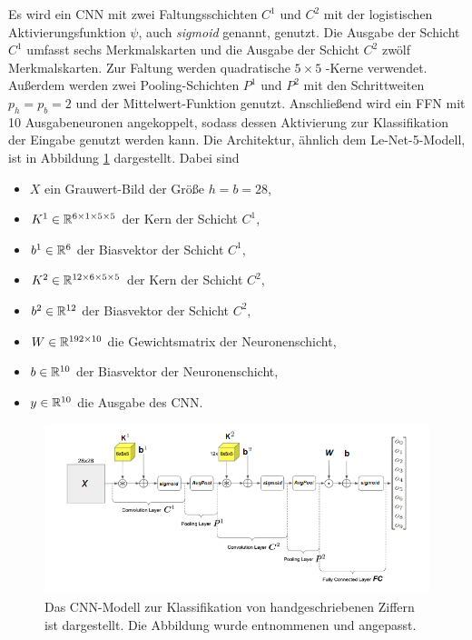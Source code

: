 Es wird ein CNN mit zwei Faltungsschichten $C^1$ und $C^2$ mit der logistischen Aktivierungsfunktion $\psi$, auch \textit{sigmoid} genannt, genutzt. Die Ausgabe der Schicht $C^1$ umfasst sechs Merkmalskarten und die Ausgabe der Schicht $C^2$ zwölf Merkmalskarten. Zur Faltung werden quadratische $5 \times 5$ -Kerne verwendet. Außerdem werden zwei Pooling-Schichten $P^1$ und $P^2$ mit den Schrittweiten $p_h=p_b=2$ und der Mittelwert-Funktion genutzt. Anschließend wird ein FFN mit 10 Ausgabeneuronen angekoppelt, sodass dessen Aktivierung zur Klassifikation der Eingabe genutzt werden kann. Die Architektur, ähnlich dem Le-Net-5-Modell\cite{DBLP:journals/pieee/LeCunBBH98}, ist in Abbildung \ref{modell} dargestellt. Dabei sind

\begin{itemize}
    \item $X$ ein Grauwert-Bild der Größe $h=b=28$,
    \item $K^1 \in \mathbb{R}^{6 \times 1 \times 5 \times 5}$ der Kern der Schicht $C^1$,
    \item $b^1 \in \mathbb{R}^6$ der Biasvektor der Schicht $C^1$,
    \item $K^2 \in \mathbb{R}^{12 \times 6 \times 5 \times 5}$ der Kern der Schicht $C^2$,
    \item $b^2 \in \mathbb{R}^{12}$ der Biasvektor der Schicht $C^2$,
    \item $W \in \mathbb{R}^{192 \times 10}$ die Gewichtsmatrix der Neuronenschicht,
    \item $b \in \mathbb{R}^{10}$ der Biasvektor der Neuronenschicht,
    \item $y \in \mathbb{R}^{10}$ die Ausgabe des CNN. 
\end{itemize}

\begin{figure}[h]
    \includegraphics[width=1.0\textwidth]{pics/chapters/CCN/modell_arch_anp.png}
    \centering
    \caption{Das CNN-Modell zur Klassifikation von handgeschriebenen Ziffern ist dargestellt. Die Abbildung wurde \cite{gentle} entnommenen und angepasst.}
    \label{modell}
\end{figure}

